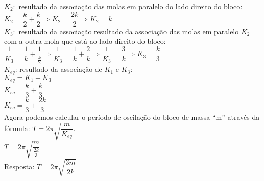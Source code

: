 \documentclass[a4paper, 12pt]{article}
\begin{document}
\begin{enumerate}
  $K_2:$ resultado da associação das molas em paralelo do lado direito do bloco: \\
  
  $K_2 = \dfrac{k}{2} + \dfrac{k}{2} \Rightarrow K_2 = \dfrac{2k}{2} \Rightarrow K_2 = k$ \\
    
 $K_3:$ resultado da associação resultado da associação das molas em paralelo $K_2$ com a outra mola que está ao lado direito do bloco: \\
 
 $\dfrac{1}{K_3} = \dfrac{1}{k} + \dfrac{1}{\frac{k}{2}} \Rightarrow \dfrac{1}{K_3} =  \dfrac{1}{k} + \dfrac{2}{k}  \Rightarrow \dfrac{1}{K_3} =  \dfrac{3}{k} \Rightarrow K_3 = \dfrac{k}{3} $ \\
 
 $K_{eq}$: resultado da associação de $K_1$ e $K_3$: \\
 
  $K_{eq} = K_1 + K_3$ \\
  
  $K_{eq} =\dfrac{k}{3} + \dfrac{k}{3}$ \\
  
   $K_{eq} =\dfrac{k}{3} + \dfrac{2k}{3}$ \\

Agora podemos calcular o  período de oscilação do bloco de massa “m” através da fórmula:  $T = 2 \pi \sqrt{\dfrac{m}{K_{eq}}}$. \\

$ T =  2 \pi \sqrt{\dfrac{m}{\frac{2k}{3}}}$ \\

Resposta:  $ T =  2 \pi \sqrt{\dfrac{3m}{2k}}$ \\

  
 
  
  
\end{enumerate}

 
\end{document}
